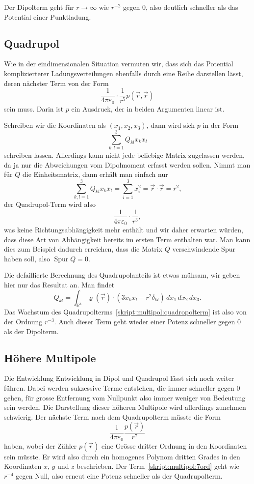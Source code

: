 Der Dipolterm geht für $r\to\infty$ wie $r^{-2}$ gegen $0$, also
deutlich schneller als das Potential einer Punktladung.

\subsection{Quadrupol}
Wie in der eindimensionalen Situation vermuten wir, dass sich
das Potential komplizierterer Ladungsverteilungen ebenfalls durch
eine Reihe darstellen lässt, deren nächster Term von der Form
\begin{equation}
\frac1{4\pi\varepsilon_0}\cdot\frac{1}{r^5} p(\vec{r},\vec{r})
\label{skript:multipol:quadropolterm}
\end{equation}
sein muss.
Darin ist $p$ ein Ausdruck, der in beiden Argumenten linear ist.

Schreiben wir die Koordinaten als $(x_1,x_2,x_3)$, dann wird 
sich $p$ in der Form
\[
\sum_{k,l=1}^3 Q_{kl}x_kx_l
\]
schreiben lassen.
Allerdings kann nicht jede beliebige Matrix zugelassen werden, 
da ja nur die Abweichungen vom Dipolmoment erfasst werden sollen.
Nimmt man für $Q$ die Einheitsmatrix, dann erhält man einfach nur
\[
\sum_{k,l=1}^3 Q_{kl}x_kx_l=\sum_{i=1}^3 x_i^2 = \vec{r}\cdot\vec{r}=r^2,
\]
der Quadrupol-Term wird also 
\[
\frac1{4\pi\varepsilon_0}\cdot\frac{1}{r^3},
\]
was keine Richtungsabhängigkeit mehr enthält und wir daher erwarten
würden, dass diese Art von Abhängigkeit bereits im ersten Term 
enthalten war.
Man kann dies zum Beispiel dadurch erreichen, dass die Matrix $Q$ 
verschwindende Spur haben soll, also $\operatorname{Spur}Q=0$.

Die defaillierte Berechnung des Quadrupolanteils ist etwas mühsam,
wir geben hier nur das Resultat an.
Man findet
\[
Q_{kl}
=
\int_{\mathbb R^3}
\varrho(\vec{r}) \cdot (3x_kx_l-r^2\delta_{kl})
\,dx_1\,dx_2\,dx_3.
\]
Das Wachstum des Quadrupolterms~\eqref{skript:multipol:quadropolterm}
ist also von der Ordnung $r^{-3}$.
Auch dieser Term geht wieder einer Potenz schneller gegen $0$ als der
Dipolterm.

\subsection{Höhere Multipole}
Die Entwicklung Entwicklung in Dipol und Quadrupol lässt sich noch
weiter führen.
Dabei werden sukzessive Terme entstehen, die immer schneller gegen $0$
gehen, für grosse Entfernung vom Nullpunkt also immer weniger von
Bedeutung sein werden.
Die Darstellung dieser höheren Multipole wird allerdings zunehmen
schwierig. 
Der nächste Term nach dem Quadrupolterm müsste die Form
\begin{equation}
\frac1{4\pi\varepsilon_0}\frac{p(\vec r)}{r^7}
\label{skript:multipol:7ord}
\end{equation}
haben, wobei der Zähler $p(\vec r)$ eine Grösse dritter Ordnung in
den Koordinaten sein müsste.
Er wird also durch ein homogenes Polynom dritten Grades in den Koordinaten
$x$, $y$ und $z$ beschrieben.
Der Term~\eqref{skript:multipol:7ord} geht wie $r^{-4}$ gegen Null,
also erneut eine Potenz schneller als der Quadrupolterm.

